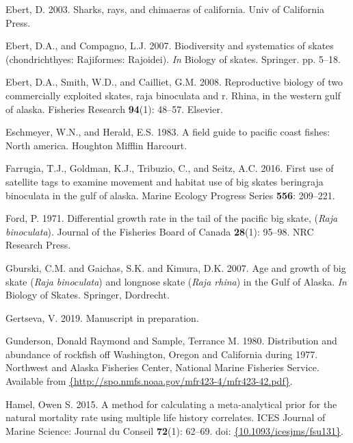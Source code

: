 \documentclass[12pt,]{article}
\begin{document}
\leavevmode\hypertarget{ref-Ebert2003}{}%
Ebert, D. 2003. Sharks, rays, and chimaeras of california. Univ of
California Press.

\leavevmode\hypertarget{ref-Ebert2007}{}%
Ebert, D.A., and Compagno, L.J. 2007. Biodiversity and systematics of
skates (chondrichthyes: Rajiformes: Rajoidei). \emph{In} Biology of
skates. Springer. pp. 5--18.

\leavevmode\hypertarget{ref-Ebert2008}{}%
Ebert, D.A., Smith, W.D., and Cailliet, G.M. 2008. Reproductive biology
of two commercially exploited skates, raja binoculata and r. Rhina, in
the western gulf of alaska. Fisheries Research \textbf{94}(1): 48--57.
Elsevier.

\leavevmode\hypertarget{ref-Eschmeyer1983}{}%
Eschmeyer, W.N., and Herald, E.S. 1983. A field guide to pacific coast
fishes: North america. Houghton Mifflin Harcourt.

\leavevmode\hypertarget{ref-Farrugia2016}{}%
Farrugia, T.J., Goldman, K.J., Tribuzio, C., and Seitz, A.C. 2016. First
use of satellite tags to examine movement and habitat use of big skates
beringraja binoculata in the gulf of alaska. Marine Ecology Progress
Series \textbf{556}: 209--221.

\leavevmode\hypertarget{ref-Ford1971}{}%
Ford, P. 1971. Differential growth rate in the tail of the pacific big
skate, (\emph{Raja binoculata}). Journal of the Fisheries Board of
Canada \textbf{28}(1): 95--98. NRC Research Press.

\leavevmode\hypertarget{ref-Gburski2007}{}%
Gburski, C.M. and Gaichas, S.K. and Kimura, D.K. 2007. Age and growth of
big skate (\emph{Raja binoculata}) and longnose skate (\emph{Raja
rhina}) in the Gulf of Alaska. \emph{In} Biology of Skates. Springer,
Dordrecht.

\leavevmode\hypertarget{ref-Gertseva2019}{}%
Gertseva, V. 2019. Manuscript in preparation.

\leavevmode\hypertarget{ref-Gunderson1980}{}%
Gunderson, Donald Raymond and Sample, Terrance M. 1980. Distribution and
abundance of rockfish off Washington, Oregon and California during 1977.
Northwest and Alaska Fisheries Center, National Marine Fisheries
Service. Available from
\href{\%7Bhttp://spo.nmfs.noaa.gov/mfr423-4/mfr423-42.pdf\%7D}{\{http://spo.nmfs.noaa.gov/mfr423-4/mfr423-42.pdf\}}.

\leavevmode\hypertarget{ref-Hamel2015}{}%
Hamel, Owen S. 2015. A method for calculating a meta-analytical prior
for the natural mortality rate using multiple life history correlates.
ICES Journal of Marine Science: Journal du Conseil \textbf{72}(1):
62--69. doi:
\href{https://doi.org/\%7B10.1093/icesjms/fsu131\%7D}{\{10.1093/icesjms/fsu131\}}.
\end{document}

